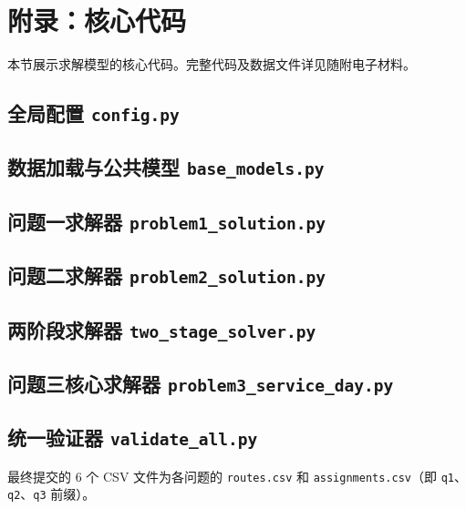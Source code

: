 \documentclass[withoutpreface]{cumcmthesis}
\begin{document}
\appendix
\section{附录：核心代码}

本节展示求解模型的核心代码。完整代码及数据文件详见随附电子材料。

\subsection{全局配置 \texttt{config.py}}


\subsection{数据加载与公共模型 \texttt{base\_models.py}}


\subsection{问题一求解器 \texttt{problem1\_solution.py}}


\subsection{问题二求解器 \texttt{problem2\_solution.py}}


\subsection{两阶段求解器 \texttt{two\_stage\_solver.py}}


\subsection{问题三核心求解器 \texttt{problem3\_service\_day.py}}


\subsection{统一验证器 \texttt{validate\_all.py}}


最终提交的 6 个 CSV 文件为各问题的 \texttt{routes.csv} 和 \texttt{assignments.csv}（即 \texttt{q1}、\texttt{q2}、\texttt{q3} 前缀）。
\end{document}
